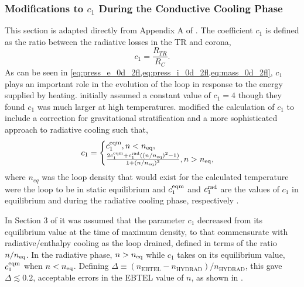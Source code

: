 \subsubsection{Modifications to $c_1$ During the Conductive Cooling Phase}\label{sec:c1-correction}

This section is adapted directly from Appendix A of \citet[\autoref{ch:inferring_hot_plasma} of this thesis]{barnes_inference_2016}. The coefficient $c_1$ is defined as the ratio between the radiative losses in the TR and corona,
\begin{equation}\label{eq:c1_def}
    c_1 = \frac{R_{TR}}{R_C}.
\end{equation}
As can be seen in \cref{eq:press_e_0d_2fl,eq:press_i_0d_2fl,eq:mass_0d_2fl}, $c_1$ plays an important role in the evolution of the loop in response to the energy supplied by heating. \citet{klimchuk_highly_2008} initially assumed a constant value of $c_1=4$ though they found $c_1$ was much larger at high temperatures. \citet{cargill_enthalpy-based_2012} modified the calculation of $c_1$ to include a correction for gravitational stratification and a more sophisticated approach to radiative cooling such that,
\begin{equation}\label{eq:c1_mod1}
    c_1 =
    \begin{cases}
        c_1^\textup{eqm}, n < n_\textup{eq}, \\
        \frac{2c_1^\textup{eqm} + c_1^\textup{rad}((n/n_\textup{eq})^2 - 1)}{1 + (n/n_\textup{eq})^2}, n > n_\textup{eq},
    \end{cases}
\end{equation} 
where $n_{eq}$ was the loop density that would exist for the calculated temperature were the loop to be in static equilibrium \citep[Equation 17 of][]{cargill_enthalpy-based_2012} and $c_1^\textup{eqm}$ and $c_1^\textup{rad}$ are the values of $c_1$ in equilibrium and during the radiative cooling phase, respectively \citep[see Equations 12 and 16 of][]{cargill_enthalpy-based_2012}. 

In Section 3 of \citet{cargill_enthalpy-based_2012} it was assumed that the parameter $c_1$ decreased from its equilibrium value at the time of maximum density, to that commensurate with radiative/enthalpy cooling as the loop drained, defined in terms of the ratio $n/n_\textup{eq}$. In the radiative phase, $n > n_\textup{eq}$ while $c_1$ takes on its equilibrium value, $c_1^\textup{eqm}$ when $n < n_\textup{eq}$. Defining $\Delta\equiv(n_{\mathrm{EBTEL}} - n_{\mathrm{HYDRAD}})/n_{\mathrm{HYDRAD}}$, this gave $\Delta\lesssim0.2$, acceptable errors in the EBTEL value of $n$, as shown in \citet{cargill_enthalpy-based_2012}.

